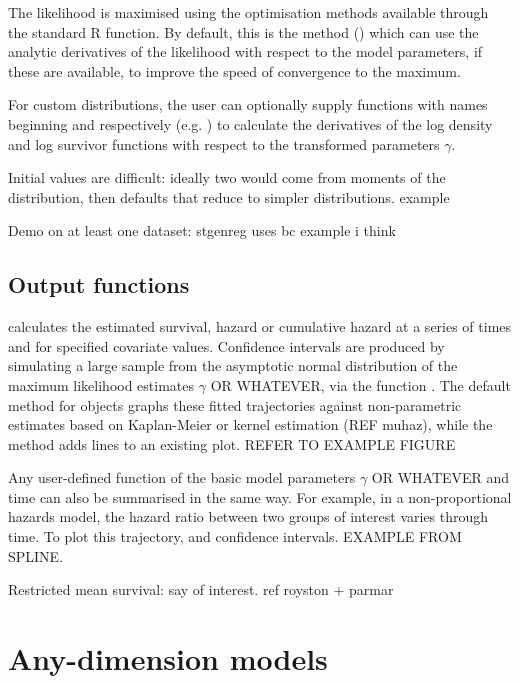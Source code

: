 \documentclass[nojss,nofooter]{jss}
\begin{document}
The likelihood is maximised using the optimisation methods available
through the standard R  function.  By default, this is the
 method (\citep{nash}) which can use the analytic
derivatives of the likelihood with respect to the model parameters, if
these are available, to improve the speed of convergence to the
maximum.

For custom distributions, the user can optionally supply functions
with names beginning  and  respectively
(e.g. ) to calculate the derivatives of
the log density and log survivor functions with respect to the
transformed parameters $\gamma$.

Initial values are difficult: ideally two would come from moments of
the distribution, then defaults that reduce to simpler distributions.
example

Demo on at least one dataset: stgenreg uses bc example i think




\subsection{Output functions}

 calculates the estimated survival, hazard
or cumulative hazard at a series of times and for specified covariate
values. Confidence intervals are produced by simulating a large sample
from the asymptotic normal distribution of the maximum likelihood
estimates $\gamma$ OR WHATEVER, via the function
.  The default  method for
 objects graphs these fitted trajectories against
non-parametric estimates based on Kaplan-Meier or kernel estimation
(REF muhaz), while the  method adds lines to an existing
plot.  REFER TO EXAMPLE FIGURE

Any user-defined function of the basic model parameters $\gamma$ OR
WHATEVER and time can also be summarised in the same way.  For
example, in a non-proportional hazards model, the hazard ratio between
two groups of interest varies through time.  To plot this trajectory,
and confidence intervals.   EXAMPLE FROM SPLINE. 

Restricted mean survival: say of interest. ref royston + parmar


\section{Any-dimension models}
\end{document}
